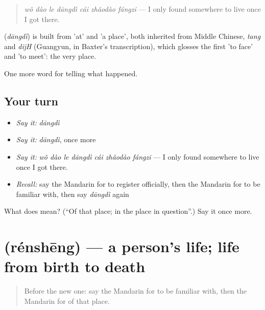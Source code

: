 \begin{quote}
\textbf{} \emph{wǒ dào le dāngdì cái zhǎodào fángzi} — I only found somewhere to live once I got there.
\end{quote}

\begin{cousinweb}
\textbf{} (\emph{dāngdì}) is built from  'at' and  'a place', both inherited from Middle Chinese, \emph{tang} and \emph{dijH} (Guangyun, in Baxter's transcription), which glosses the first 'to face' and 'to meet': the very place.
\end{cousinweb}

\begin{grammarlens}[title={What you've built}]
One more word for telling what happened.
\end{grammarlens}

\subsection*{Your turn}
\begin{itemize}
\raggedright
  \item \emph{Say it:} \emph{dāngdì}
  \item \emph{Say it:} \emph{dāngdì}, once more
  \item \emph{Say it:} \emph{wǒ dào le dāngdì cái zhǎodào fángzi} — I only found somewhere to live once I got there.
  \item \emph{Recall:} say the Mandarin for to register officially, then the Mandarin for to be familiar with, then say \emph{dāngdì} again
\end{itemize}

\begin{tcolorbox}[breakable,colback=teal!4,colframe=teal!35!black,title={Before you move on}]
What does  mean? (\textquotedblleft{}Of that place; in the place in question\textquotedblright{}.) Say it once more.
\end{tcolorbox}
\section[\texorpdfstring{\zh{人生} (rénshēng)}{人生 (rénshēng)}]{ (rénshēng) — a person's life; life from birth to death}

\label{lesson:ZH-C316-rensheng}



\begin{quote}
Before the new one: say the Mandarin for to be familiar with, then the Mandarin for of that place.
\end{quote}


